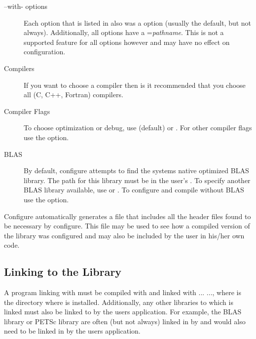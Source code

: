 \begin{description}

\item[--with- options] Each  option that is listed in
 also was a  option (usually the
default, but not always).  Additionally, all  options
have a ={\it pathname}.  This is not a
supported feature for all  options however and may have
no effect on configuration.

\item[Compilers] If you want to choose a compiler then is it recommended
that you choose all (C, C++, Fortran) compilers.

\item[Compiler Flags] To choose optimization or debug, use
 (default) or .
For other compiler flags use the  option.

\item[BLAS] By default, configure attempts to find the systems native
optimized BLAS library.  The path for this library must be in the
user's .  To specify another BLAS library available, use
 or
.  To configure and compile without
BLAS use the  option.
\end{description}

Configure automatically generates a file  that
includes all the header files found to be necessary by configure.
This file may be used to see how a compiled version of the library was
configured and may also be included by the user in his/her own code.

\subsection{Linking to the Library}

A program linking with \hypre{} must be compiled with
 and linked with
... 
..., where  is the
directory where \hypre{} is installed.  Additionally, any other
libraries to which \hypre{} is linked must also be linked to by the
users application.  For example, the BLAS library or PETSc library are
often (but not always) linked in by \hypre{} and would also need to be
linked in by the users application.

